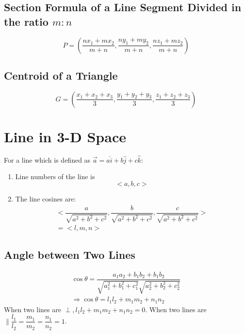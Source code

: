 \documentclass[openany, oneside]{book}
\begin{document}
\section{Section Formula of a Line Segment Divided in the ratio $m:n$\newline}
\begin{equation}
P=\left(\dfrac{nx_1+mx_2}{m+n},\dfrac{ny_1+my_2}{m+n},\dfrac{nz_1+mz_2}{m+n}\right)
\end{equation}

\section{Centroid of a Triangle\newline}
\begin{equation}
G=\left(\dfrac{x_1+x_2+x_3}{3},\dfrac{y_1+y_2+y_3}{3},\dfrac{z_1+z_2+z_3}{3}\right)
\end{equation}

\large{\chapter{Line in 3-D Space}}
For a line which is defined as $\vec{a}=a\hat{i}+b\hat{j}+c\hat{k}$:
\begin{enumerate}
\item Line numbers of the line is
\begin{equation}
<a,b,c>
\end{equation}
\item The line cosines are:
\begin{align}
<\dfrac{a}{\sqrt{a^2+b^2+c^2}},\dfrac{b}{\sqrt{a^2+b^2+c^2}},\dfrac{c}{\sqrt{a^2+b^2+c^2}}>\\
=<l,m,n>
\end{align}
\end{enumerate}

\section{Angle between Two Lines\newline}
\begin{align}
\cos \theta	=\dfrac{a_1a_2+b_1b_2+b_1b_2}{\sqrt{a_1^2+b_1^2+c_1^2}\sqrt{a_2^2+b_2^2+c_2^2}}\\
\Rightarrow \cos \theta= l_1l_2+m_1m_2+n_1n_2
\end{align}
When two lines are $\perp, l_1l_2+m_1m_2+n_1n_2=0$.\newline
When two lines are $\parallel \dfrac{l_1}{l_2}=\dfrac{m_1}{m_2}=\dfrac{n_1}{n_2}=1$.
\end{document}
